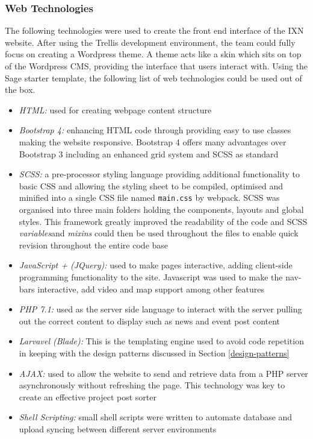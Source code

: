 \documentclass[fontsize=11pt]{extarticle}
\numberwithin{figure}{section} %
\numberwithin{table}{section}%
\providecommand{\tightlist}{%
  \setlength{\itemsep}{0pt}\setlength{\parskip}{0pt}}
\begin{document}
\hypertarget{web-technologies}{%
\subsubsection{Web Technologies}\label{web-technologies}}

The following technologies were used to create the front end interface
of the IXN website. After using the Trellis development environment, the
team could fully focus on creating a Wordpress theme. A theme acts like
a skin which sits on top of the Wordpress CMS, providing the interface
that users interact with. Using the Sage starter template, the following
list of web technologies could be used out of the box.

\begin{itemize}
\tightlist
\item
  \emph{HTML:} used for creating webpage content structure
\item
  \emph{Bootstrap 4:} enhancing HTML code through providing easy to use
  classes making the website responsive. Bootstrap 4 offers many
  advantages over Bootstrap 3 including an enhanced grid system and SCSS
  as standard \cite{Differen19:online}
\item
  \emph{SCSS:} a pre-processor styling language providing additional
  functionality to basic CSS and allowing the styling sheet to be
  compiled, optimised and minified into a single CSS file named
  \texttt{main.css} by webpack. SCSS was organised into three main
  folders holding the components, layouts and global styles. This
  framework greatly improved the readability of the code and SCSS
  \emph{variables}and \emph{mixins} could then be used throughout the
  files to enable quick revision throughout the entire code base
\item
  \emph{JavaScript + (JQuery):} used to make pages interactive, adding
  client-side programming functionality to the site. Javascript was used
  to make the nav-bars interactive, add video and map support among
  other features
\item
  \emph{PHP 7.1:} used as the server side language to interact with the
  server pulling out the correct content to display such as news and
  event post content
\item
  \emph{Larvavel (Blade): } This is the templating engine used to avoid
  code repetition in keeping with the design patterns discussed in
  Section \ref{design-patterns}
\item
  \emph{AJAX:} used to allow the website to send and retrieve data from
  a PHP server asynchronously without refreshing the page. This
  technology was key to create an effective project post sorter
\item
  \emph{Shell Scripting: } small shell scripts were written to automate
  database and upload syncing between different server environments
\end{itemize}
\end{document}
